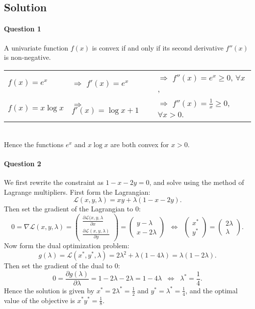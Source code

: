 \documentclass{article}
\begin{document}
\subsection*{Solution}

\paragraph{Question 1}
A univariate function $f(x)$ is convex if and only if its second derivative $f''(x)$ is non-negative.\\

\begin{tabular}{lll}
$f(x) = e^x$ & $\Rightarrow$ $f'(x) = e^x$ & $\Rightarrow$ $f''(x) = e^x \geq 0$, $\forall x$,\\
$f(x) = x\log x$ & $\Rightarrow$ $f'(x) = \log x + 1$ & $\Rightarrow$ $f''(x) = \frac 1 x \geq 0$, $\forall x > 0$.\\
\end{tabular}\\

\noindent
Hence the functions $e^x$ and $x\log x$ are both convex for $x>0$.

\paragraph{Question 2}
We first rewrite the constraint as $1 - x - 2y = 0$, and solve using the method of Lagrange multipliers. First form the Lagrangian:
\[
\mathcal{L}(x,y,\lambda) = xy + \lambda(1 - x - 2y).
\]
Then set the gradient of the Lagrangian to $0$:
\[
0 = \nabla\mathcal{L}(x,y,\lambda)
= \left( \begin{array}{c} \frac {\partial\mathcal{L}(x,y,\lambda} {\partial x}\\ \frac {\partial\mathcal{L}(x,y,\lambda)} {\partial y} \end{array} \right)
= \left( \begin{array}{c} y - \lambda\\ x - 2\lambda \end{array} \right)
\;\; \Leftrightarrow \;\;
\left( \begin{array}{c} x^*\\ y^* \end{array} \right)
= \left( \begin{array}{c} 2\lambda\\ \lambda \end{array} \right).
\]
Now form the dual optimization problem:
\[
g(\lambda) = \mathcal{L}(x^*,y^*,\lambda) = 2\lambda^2 + \lambda(1 - 4\lambda) = \lambda(1 - 2\lambda).
\]
Then set the gradient of the dual to $0$:
\[
0 = \frac {\partial g(\lambda)} {\partial \lambda} = 1 - 2\lambda - 2\lambda = 1 - 4\lambda
\;\; \Leftrightarrow \;\;
\lambda^* = \frac 1 4.
\]
Hence the solution is given by $x^* = 2\lambda^* = \frac 1 2$ and $y^* = \lambda^* = \frac 1 4$, and the optimal value of the objective is $x^*y^* = \frac 1 8$.
\end{document}
